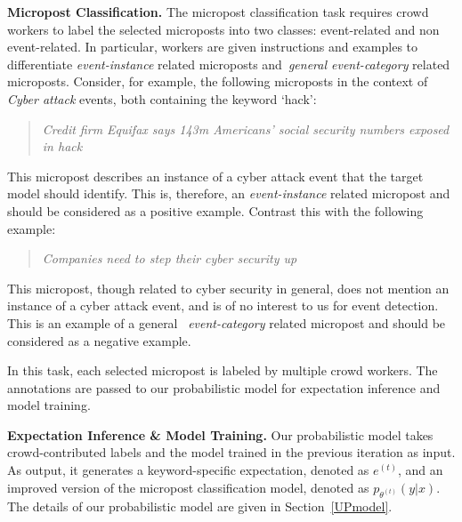 \documentclass[letterpaper]{article}
\begin{document}
\smallskip
\noindent\textbf{Micropost Classification.} The micropost classification task requires crowd workers to label the selected microposts into two classes: event-related and non event-related. In particular, workers are given instructions and examples to differentiate \emph{event-instance} related microposts and~\emph{general event-category} related microposts. Consider, for example, the following microposts in the context of \emph{Cyber attack} events, both containing the keyword \lq hack':
\begin{quote}
    \emph{Credit firm Equifax says 143m Americans' social security numbers exposed in hack}
\end{quote}
     This micropost describes an instance of a cyber attack event that the target model should identify. This is, therefore, an \emph{event-instance} related micropost and should be considered as a positive example. Contrast this with the following example:
     
\begin{quote}
    \emph{Companies need to step their cyber security up}
\end{quote}
This micropost, though related to cyber security in general, does not mention an instance of a cyber attack event, and is of no interest to us for event detection. This is an example of a general ~\emph{event-category} related micropost and should be considered as a negative example.

In this task, each selected micropost is labeled by multiple crowd workers. The annotations are passed to our probabilistic model for expectation inference and model training.

\smallskip
\noindent\textbf{Expectation Inference \& Model Training.} Our probabilistic model takes crowd-contributed labels and the model trained in the previous iteration as input. As output, it generates a keyword-specific expectation, denoted as $e^{(t)}$, and an improved version of the micropost classification model, denoted as $p_{\theta^{(t)}}(y|x)$. The details of our probabilistic model are given in Section~\ref{UPmodel}.
 
\end{document}

